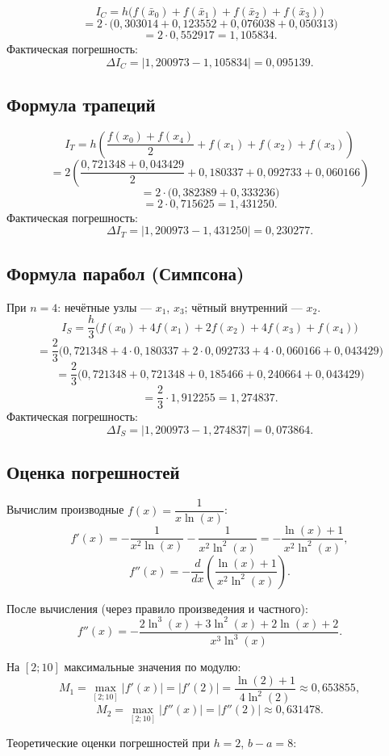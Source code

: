 \documentclass[a4paper, final]{article}
\begin{document}
\[
I_C = h\bigl(f(\bar x_0)+f(\bar x_1)+f(\bar x_2)+f(\bar x_3)\bigr)
\]
\[
= 2 \cdot\bigl(0{,}303014+0{,}123552+0{,}076038+0{,}050313\bigr)
\]
\[
= 2 \cdot 0{,}552917 = 1{,}105834.
\]
Фактическая погрешность:
\[
\Delta I_C = |1{,}200973 - 1{,}105834| = 0{,}095139.
\]

\subsection{Формула трапеций}

\[
I_T = h\!\left(\frac{f(x_0)+f(x_4)}{2}+f(x_1)+f(x_2)+f(x_3)\right)
\]
\[
= 2\!\left(\frac{0{,}721348+0{,}043429}{2}+0{,}180337+0{,}092733+0{,}060166\right)
\]
\[
= 2\cdot\bigl(0{,}382389 + 0{,}333236\bigr)
\]
\[
= 2 \cdot 0{,}715625 = 1{,}431250.
\]
Фактическая погрешность:
\[
\Delta I_T = |1{,}200973 - 1{,}431250| = 0{,}230277.
\]

\subsection{Формула парабол (Симпсона)}

При $n=4$: нечётные узлы --- $x_1$, $x_3$; чётный внутренний --- $x_2$.
\[
I_S = \frac{h}{3}\bigl(f(x_0)+4f(x_1)+2f(x_2)+4f(x_3)+f(x_4)\bigr)
\]
\[
= \frac{2}{3}\bigl(0{,}721348+4\cdot0{,}180337+2\cdot0{,}092733+4\cdot0{,}060166+0{,}043429\bigr)
\]
\[
= \frac{2}{3}\bigl(0{,}721348+0{,}721348+0{,}185466+0{,}240664+0{,}043429\bigr)
\]
\[
= \frac{2}{3}\cdot 1{,}912255 = 1{,}274837.
\]
Фактическая погрешность:
\[
\Delta I_S = |1{,}200973 - 1{,}274837| = 0{,}073864.
\]

\subsection{Оценка погрешностей}

Вычислим производные $f(x) = \dfrac{1}{x\ln(x)}$:
\[
f'(x) = -\frac{1}{x^2\ln(x)} - \frac{1}{x^2\ln^2(x)} = -\frac{\ln(x)+1}{x^2\ln^2(x)},
\]
\[
f''(x) = -\frac{d}{dx}\left(\frac{\ln(x)+1}{x^2\ln^2(x)}\right).
\]

После вычисления (через правило произведения и частного):
\[
f''(x) = -\frac{2\ln^3(x)+3\ln^2(x)+2\ln(x)+2}{x^3\ln^3(x)}.
\]

На $[2; 10]$ максимальные значения по модулю:
\[
M_1 = \max_{[2;10]}|f'(x)| = |f'(2)| = \frac{\ln(2)+1}{4\ln^2(2)} \approx 0{,}653855,
\]
\[
M_2 = \max_{[2;10]}|f''(x)| = |f''(2)| \approx 0{,}631478.
\]

Теоретические оценки погрешностей при $h = 2$, $b - a = 8$:
\end{document}
